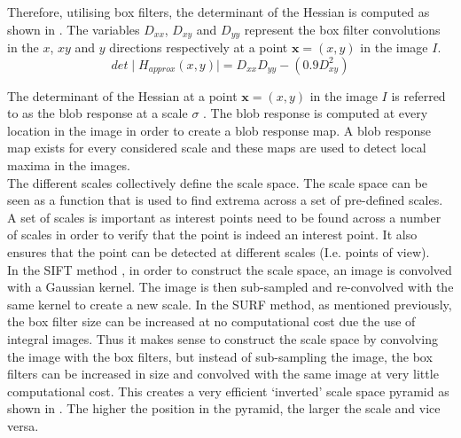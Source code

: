 \documentclass{article}
\begin{document}
Therefore, utilising box filters, the determinant of the Hessian is computed as shown in . The variables $D_{xx}$, $D_{xy}$ and $D_{yy}$ represent the box filter convolutions in the $x$, $xy$ and $y$ directions respectively at a point $\textbf{x} = (x,y)$ in the image $I$.\\ 

\begin{equation}
det \mid H_{approx} (x,y) \mid = D_{xx}D_{yy} - (0.9 D_{xy}^2)
\label{eqn:approxHessian}
\end{equation}

The determinant of the Hessian at a point $\textbf{x} = (x,y)$ in the image $I$ is referred to as the blob response at a scale $\sigma$ \cite{Bay2008}. The blob response is computed at every location in the image in order to create a blob response map. A blob response map exists for every considered scale and these maps are used to detect local maxima in the images.\\

The different scales collectively define the scale space. The scale space can be seen as a function that is used to find extrema across a set of pre-defined scales. A set of scales is important as interest points need to be found across a number of scales in order to verify that the point is indeed an interest point. It also ensures that the point can be detected at different scales (I.e. points of view).\\

In the SIFT method \cite{Lowe2004}, in order to construct the scale space, an image is convolved with a Gaussian kernel. The image is then sub-sampled and re-convolved with the same kernel to create a new scale. In the SURF method, as mentioned previously, the box filter size can be increased at no computational cost due the use of integral images. Thus it makes sense to construct the scale space by convolving the image with the box filters, but instead of sub-sampling the image, the box filters can be increased in size and convolved with the same image at very little computational cost. This creates a very efficient `inverted' scale space pyramid as shown in  \cite{Evans2009}. The higher the position in the pyramid, the larger the scale and vice versa. \\
\end{document}
